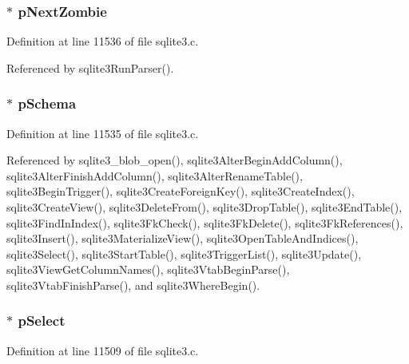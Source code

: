 \subsubsection[{p\+Next\+Zombie}]{$\ast$ p\+Next\+Zombie}\label{struct_table_a2c75a77cbf15e71f861a82754851142f}


Definition at line 11536 of file sqlite3.\+c.



Referenced by sqlite3\+Run\+Parser().

\hypertarget{struct_table_ac262c2ca980f0326edbe82bbe7fda205}{}
\subsubsection[{p\+Schema}]{$\ast$ p\+Schema}\label{struct_table_ac262c2ca980f0326edbe82bbe7fda205}


Definition at line 11535 of file sqlite3.\+c.



Referenced by sqlite3\+\_\+blob\+\_\+open(), sqlite3\+Alter\+Begin\+Add\+Column(), sqlite3\+Alter\+Finish\+Add\+Column(), sqlite3\+Alter\+Rename\+Table(), sqlite3\+Begin\+Trigger(), sqlite3\+Create\+Foreign\+Key(), sqlite3\+Create\+Index(), sqlite3\+Create\+View(), sqlite3\+Delete\+From(), sqlite3\+Drop\+Table(), sqlite3\+End\+Table(), sqlite3\+Find\+In\+Index(), sqlite3\+Fk\+Check(), sqlite3\+Fk\+Delete(), sqlite3\+Fk\+References(), sqlite3\+Insert(), sqlite3\+Materialize\+View(), sqlite3\+Open\+Table\+And\+Indices(), sqlite3\+Select(), sqlite3\+Start\+Table(), sqlite3\+Trigger\+List(), sqlite3\+Update(), sqlite3\+View\+Get\+Column\+Names(), sqlite3\+Vtab\+Begin\+Parse(), sqlite3\+Vtab\+Finish\+Parse(), and sqlite3\+Where\+Begin().

\hypertarget{struct_table_ab0e0ccc47de126415a7ad889ff1d228a}{}
\subsubsection[{p\+Select}]{$\ast$ p\+Select}\label{struct_table_ab0e0ccc47de126415a7ad889ff1d228a}


Definition at line 11509 of file sqlite3.\+c.



